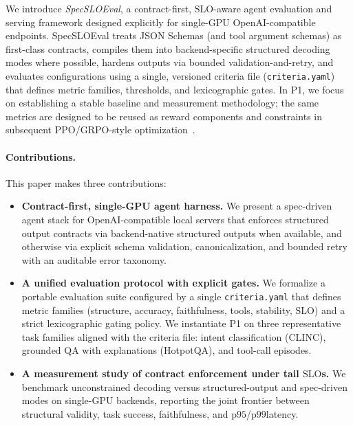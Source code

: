 \documentclass[11pt]{article}
\newcommand{\pninetyfive}{\ensuremath{\mathrm{p95}}}
\newcommand{\pninetynine}{\ensuremath{\mathrm{p99}}}
\newcommand{\slo}{\ensuremath{\mathrm{SLO}}}
\begin{document}
We introduce \emph{SpecSLOEval}, a contract-first, \slo-aware agent evaluation and serving framework designed explicitly for single-GPU OpenAI-compatible endpoints.
SpecSLOEval treats JSON Schemas (and tool argument schemas) as first-class contracts, compiles them into backend-specific structured decoding modes where possible, hardens outputs via bounded validation-and-retry, and evaluates configurations using a single, versioned criteria file (\texttt{criteria.yaml}) that defines metric families, thresholds, and lexicographic gates.
In P1, we focus on establishing a stable baseline and measurement methodology; the same metrics are designed to be reused as reward components and constraints in subsequent PPO/GRPO-style optimization~\citep{schulman2017ppo,grpo,dettmers2023qlora}.

\paragraph{Contributions.}
This paper makes three contributions:

\begin{itemize}[leftmargin=12pt]
    \item \textbf{Contract-first, single-GPU agent harness.}
    We present a spec-driven agent stack for OpenAI-compatible local servers that enforces structured output contracts via backend-native structured outputs when available, and otherwise via explicit schema validation, canonicalization, and bounded retry with an auditable error taxonomy.
    \item \textbf{A unified evaluation protocol with explicit gates.}
    We formalize a portable evaluation suite configured by a single \texttt{criteria.yaml} that defines metric families (structure, accuracy, faithfulness, tools, stability, \slo) and a strict lexicographic gating policy.
    We instantiate P1 on three representative task families aligned with the criteria file: intent classification (CLINC), grounded QA with explanations (HotpotQA), and tool-call episodes.
    \item \textbf{A measurement study of contract enforcement under tail \slo s.}
    We benchmark unconstrained decoding versus structured-output and spec-driven modes on single-GPU backends, reporting the joint frontier between structural validity, task success, faithfulness, and \pninetyfive/\pninetynine latency.
\end{itemize}
\end{document}

